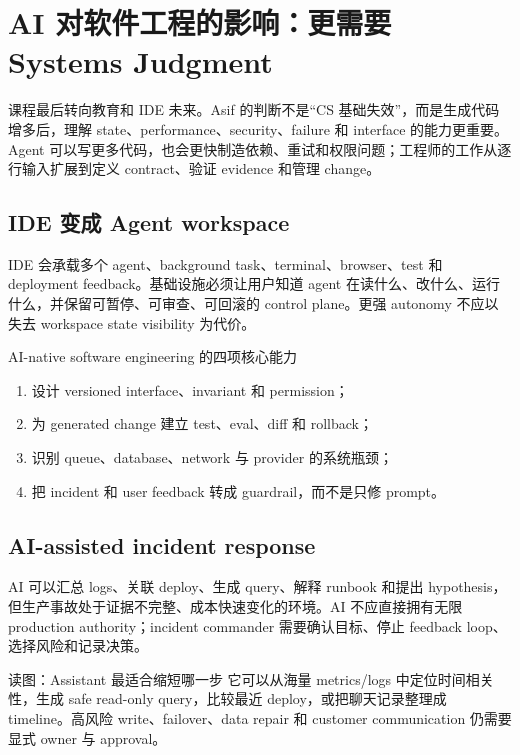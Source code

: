 \section{AI 对软件工程的影响：更需要 Systems Judgment}

课程最后转向教育和 IDE 未来。Asif 的判断不是“CS 基础失效”，而是生成代码增多后，理解 state、performance、security、failure 和 interface 的能力更重要。Agent 可以写更多代码，也会更快制造依赖、重试和权限问题；工程师的工作从逐行输入扩展到定义 contract、验证 evidence 和管理 change。

\subsection{IDE 变成 Agent workspace}

IDE 会承载多个 agent、background task、terminal、browser、test 和 deployment feedback。基础设施必须让用户知道 agent 在读什么、改什么、运行什么，并保留可暂停、可审查、可回滚的 control plane。更强 autonomy 不应以失去 workspace state visibility 为代价。

\begin{importantbox}{AI-native software engineering 的四项核心能力}
\begin{enumerate}
  \item 设计 versioned interface、invariant 和 permission；
  \item 为 generated change 建立 test、eval、diff 和 rollback；
  \item 识别 queue、database、network 与 provider 的系统瓶颈；
  \item 把 incident 和 user feedback 转成 guardrail，而不是只修 prompt。
\end{enumerate}
\end{importantbox}

\subsection{AI-assisted incident response}

AI 可以汇总 logs、关联 deploy、生成 query、解释 runbook 和提出 hypothesis，但生产事故处于证据不完整、成本快速变化的环境。AI 不应直接拥有无限 production authority；incident commander 需要确认目标、停止 feedback loop、选择风险和记录决策。


\begin{knowledgebox}{读图：Assistant 最适合缩短哪一步}
它可以从海量 metrics/logs 中定位时间相关性，生成 safe read-only query，比较最近 deploy，或把聊天记录整理成 timeline。高风险 write、failover、data repair 和 customer communication 仍需要显式 owner 与 approval。
\end{knowledgebox}


